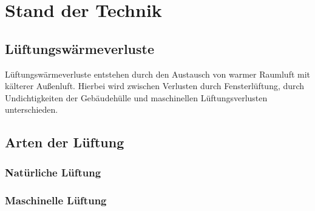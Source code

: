 \chapter{Stand der Technik}



\section{Lüftungswärmeverluste}
\label{sec:Sektion 31}

Lüftungswärmeverluste entstehen durch den Austausch von warmer Raumluft mit kälterer Außenluft.
Hierbei wird zwischen Verlusten durch Fensterlüftung, durch Undichtigkeiten der Gebäudehülle und maschinellen Lüftungsverlusten unterschieden.

\section{Arten der Lüftung}
\label{sec:Sektion 32}

\subsection{Natürliche Lüftung}
\label{subsec:Sektion 321}


\subsection{Maschinelle Lüftung}
\label{subsec:sektion 322}